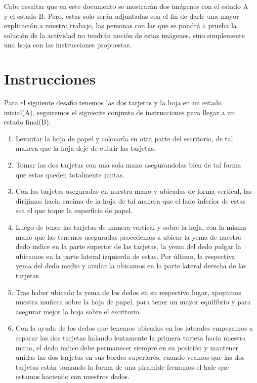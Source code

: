 \documentclass{article}
\begin{document}
\noindent
Cabe resaltar que en este documento se mostrarán dos imágenes con el estado A y el estado B. Pero, estas solo serán adjuntadas con el fin de darle una mayor explicación a nuestro trabajo, las personas con las que se pondrá a prueba la solución de la actividad no tendrán noción de estas imágenes, sino simplemente una hoja con las instrucciones propuestas. 

\section{Instrucciones} \label{contenido}
\noindent
Para el siguiente desafio tenemos las dos tarjetas y la hoja en un estado inicial(A), seguiremos el siguiente conjunto de instrucciones para llegar a un estado final(B). 
\begin{enumerate}

\item Levantar la hoja de papel y colocarla en otra parte del escritorio, de tal manera que la hoja deje de cubrir las tarjetas.

\item Tomar las dos tarjetas con una sola mano asegurandolas bien de tal forma que estas queden totalmente juntas. 

\item Con las tarjetas aseguradas en nuestra mano y ubicadas de forma vertical, las dirijimos hacia encima de la hoja de tal manera que el lado inferior de estas sea el  que toque la superficie de papel.

\item Luego de tener las tarjetas de manera vertical y sobre la hoja, con la misma mano que las tenemos aseguradas procedemos a ubicar la yema de nuestro dedo indice en la parte superior de las tarjetas, la yema del dedo pulgar la ubicamos en la parte lateral izquierda de estas. Por último, la respectiva yema del dedo medio y anular la ubicamos en la parte lateral derecha de las tarjetas.

\item Tras haber ubicado la yema de los dedos en su respectivo lugar, apoyamos nuestra muñeca sobre la hoja de papel, para tener un mayor equilibrio y para asegurar mejor la hoja sobre el escritorio.

\item Con la ayuda de los dedos que tenemos ubicados en los laterales empezamos a separar las dos tarjetas halando lentamente la primera tarjeta hacia nuestra mano, el dedo indice debe permanecer siempre en su posición y mantener unidas las dos tarjetas en sus bordes superiores, cuando veamos que las dos tarjetas están tomando la forma de una piramide frenamos el hale que estamos haciendo con nuestros dedos.


\end{enumerate}
\end{document}

